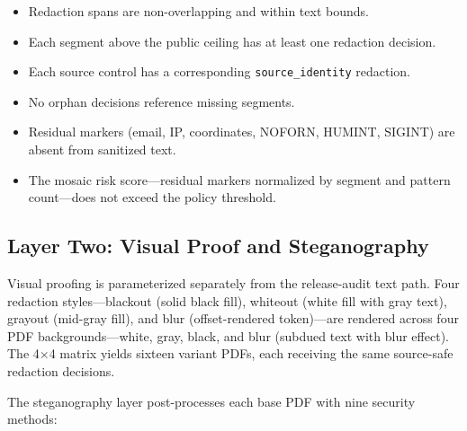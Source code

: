 \documentclass[
]{article}
\providecommand{\tightlist}{%
  \setlength{\itemsep}{0pt}\setlength{\parskip}{0pt}}
\begin{document}
\begin{itemize}
\tightlist
\item
  Redaction spans are non-overlapping and within text bounds.
\item
  Each segment above the public ceiling has at least one redaction
  decision.
\item
  Each source control has a corresponding \texttt{source\_identity}
  redaction.
\item
  No orphan decisions reference missing segments.
\item
  Residual markers (email, IP, coordinates, NOFORN, HUMINT, SIGINT) are
  absent from sanitized text.
\item
  The mosaic risk score---residual markers normalized by segment and
  pattern count---does not exceed the policy threshold.
\end{itemize}

\subsection{Layer Two: Visual Proof and
Steganography}\label{layer-two-visual-proof-and-steganography}

Visual proofing is parameterized separately from the release-audit text
path. Four redaction styles---blackout (solid black fill), whiteout
(white fill with gray text), grayout (mid-gray fill), and blur
(offset-rendered token)---are rendered across four PDF
backgrounds---white, gray, black, and blur (subdued text with blur
effect). The 4\texorpdfstring{\ensuremath{\times}}{x}4 matrix yields sixteen variant PDFs, each receiving the
same source-safe redaction decisions.

The steganography layer post-processes each base PDF with nine security
methods:
\end{document}

